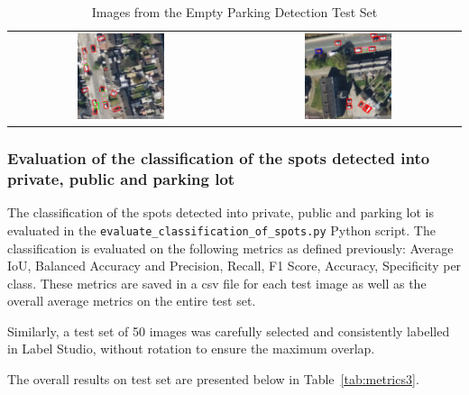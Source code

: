 \begin{table}[htbp]
\begin{tabular}{cc}
        \includegraphics[width=0.4\textwidth]{images/image5_empty_parking_detection_test_set.png} & \includegraphics[width=0.4\textwidth]{images/image6_empty_parking_detection_test_set.png} \\
    \end{tabular}
    \caption{Images from the Empty Parking Detection Test Set}
    \label{tab:test_images2}
\end{table}

\newpage{}

\subsubsection{Evaluation of the classification of the spots detected into private, public and parking lot}
The classification of the spots detected into private, public and parking lot is evaluated in the \texttt{evaluate\_classification\_of\_spots.py} Python script.
The classification is evaluated on the following metrics as defined previously: Average IoU, Balanced Accuracy and Precision, Recall, F1 Score, Accuracy, Specificity per class. These metrics are saved in a csv file for each test image as well as the overall average metrics on the entire test set.

Similarly, a test set of 50 images was carefully selected and consistently labelled in Label Studio, without rotation to ensure the maximum overlap.

The overall results on test set are presented below in Table~\ref{tab:metrics3}.

